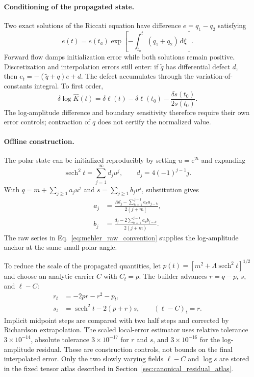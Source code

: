 ﻿\documentclass[11pt,a4paper]{article}
\newcommand{\dd}{\mathrm{d}}
\newcommand{\ee}{\mathrm{e}}
\newcommand{\sech}{\operatorname{sech}}
\begin{document}
\paragraph{Conditioning of the propagated state.}
Two exact solutions of the Riccati equation have difference $e=q_1-q_2$ satisfying
\begin{equation}
 e(t)=e(t_a)\exp\!\left[-\int_{t_a}^{t}(q_1+q_2)\,\dd\xi\right].
 \label{eq:mehler_contraction}
\end{equation}
Forward flow damps initialization error while both solutions remain positive. Discretization and interpolation errors still enter: if $\widetilde q$ has differential defect $d$, then $e_t=-(\widetilde q+q)e+d$. The defect accumulates through the variation-of-constants integral. To first order,
\begin{equation}
 \delta\log\widehat K(t)
 =\delta\ell(t)-\delta\ell(t_0)
 -\frac{\delta s(t_0)}{2s(t_0)}.
 \label{eq:mehler_normalized_error}
\end{equation}
The log-amplitude difference and boundary sensitivity therefore require their own error controls; contraction of $q$ does not certify the normalized value.

\paragraph{Offline construction.}
The polar state can be initialized reproducibly by setting $u=\ee^{2t}$ and expanding
\begin{equation}
 \sech^2t=\sum_{j=1}^{\infty}d_j u^j,
 \qquad d_j=4(-1)^{j-1}j.
\end{equation}
With $q=m+\sum_{j\geq1}a_ju^j$ and $s=\sum_{j\geq1}b_ju^j$, substitution gives
\begin{align}
 a_j&=\frac{\Lambda d_j-\sum_{k=1}^{j-1}a_ka_{j-k}}{2(j+m)},\\
 b_j&=\frac{d_j-2\sum_{k=1}^{j-1}a_kb_{j-k}}{2(j+m)}.
 \label{eq:mehler_polar_recurrence}
\end{align}
The raw series in Eq.~\eqref{eq:mehler_raw_convention} supplies the log-amplitude anchor at the same small polar angle.

To reduce the scale of the propagated quantities, let $p(t)=[m^2+\Lambda\sech^2t]^{1/2}$ and choose an analytic carrier $C$ with $C_t=p$. The builder advances $r=q-p$, $s$, and $\ell-C$:
\begin{align}
 r_t&=-2pr-r^2-p_t,\\
 s_t&=\sech^2t-2(p+r)s,
 \qquad (\ell-C)_t=r.
 \label{eq:mehler_residual_system}
\end{align}
Implicit midpoint steps are compared with two half steps and corrected by Richardson extrapolation. The scaled local-error estimator uses relative tolerance $3\times10^{-14}$, absolute tolerance $3\times10^{-17}$ for $r$ and $s$, and $3\times10^{-16}$ for the log-amplitude residual. These are construction controls, not bounds on the final interpolated error. Only the two slowly varying fields $\ell-C$ and $\log s$ are stored in the fixed tensor atlas described in Section~\ref{sec:canonical_residual_atlas}.
\end{document}
